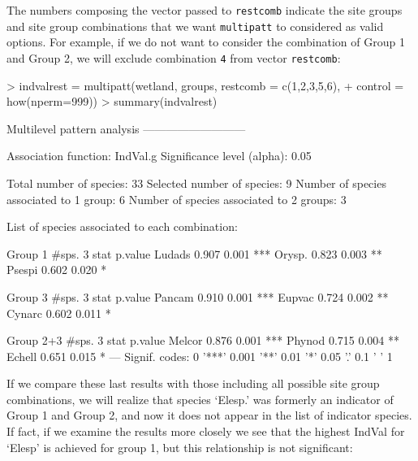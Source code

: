 \documentclass[11pt,a4paper]{article}
\begin{document}
The numbers composing the vector passed to \texttt{restcomb} indicate the site groups and site group combinations that we want \texttt{multipatt} to considered as valid options. For example, if we do not want to consider the combination of Group 1 and Group 2, we will exclude combination \texttt{4} from vector \texttt{restcomb}:
\begin{Schunk}
\begin{Sinput}
> indvalrest = multipatt(wetland, groups, restcomb = c(1,2,3,5,6), 
+                        control = how(nperm=999)) 
> summary(indvalrest)
\end{Sinput}
\begin{Soutput}
 Multilevel pattern analysis
 ---------------------------

 Association function: IndVal.g
 Significance level (alpha): 0.05

 Total number of species: 33
 Selected number of species: 9 
 Number of species associated to 1 group: 6 
 Number of species associated to 2 groups: 3 

 List of species associated to each combination: 

 Group 1  #sps.  3 
        stat p.value    
Ludads 0.907   0.001 ***
Orysp. 0.823   0.003 ** 
Psespi 0.602   0.020 *  

 Group 3  #sps.  3 
        stat p.value    
Pancam 0.910   0.001 ***
Eupvac 0.724   0.002 ** 
Cynarc 0.602   0.011 *  

 Group 2+3  #sps.  3 
        stat p.value    
Melcor 0.876   0.001 ***
Phynod 0.715   0.004 ** 
Echell 0.651   0.015 *  
---
Signif. codes:  0 '***' 0.001 '**' 0.01 '*' 0.05 '.' 0.1 ' ' 1 
\end{Soutput}
\end{Schunk}
If we compare these last results with those including all possible site group combinations, we will realize that species `Elesp.' was formerly an indicator of Group 1 and Group 2, and now it does not appear in the list of indicator species. If fact, if we examine the results more closely we see that the highest IndVal for `Elesp' is achieved for group 1, but this relationship is not significant:
\end{document}
